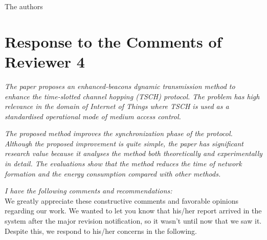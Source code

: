 \documentclass{article}
\begin{document}
The authors

\newpage
\section*{\centering Response to the Comments of Reviewer 4}

\textit{The paper proposes an enhanced-beacons dynamic transmission method to enhance the time-slotted channel hopping (TSCH) protocol. The problem has high relevance in the domain of Internet of Things where TSCH is used as a standardised operational mode of medium access control.}

\textit{The proposed method improves the synchronization phase of the protocol. Although the proposed improvement is quite simple, the paper has significant research value because it analyses the method both theoretically and experimentally in detail. The evaluations show that the method reduces the time of network formation and the energy consumption compared with other methods.}

\textit{I have the following comments and recommendations:}
\\

We greatly appreciate these constructive comments and favorable opinions regarding our work. We wanted to let you know that his/her report arrived in the system after the major revision notification, so it wasn't until now that we saw it. Despite this, we respond to his/her concerns in the following.
\end{document}
